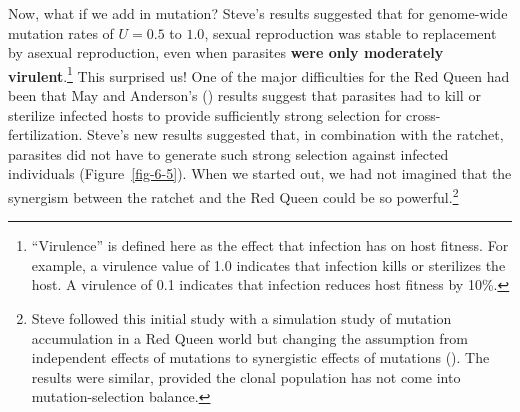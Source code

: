 \documentclass[
  letterpaper,
]{book}
\begin{document}
Now, what if we add in mutation? Steve's results suggested that for
genome-wide mutation rates of \(U = 0.5\) to \(1.0\), sexual
reproduction was stable to replacement by asexual reproduction, even
when parasites \textbf{were only moderately virulent}.\footnote{``Virulence''
  is defined here as the effect that infection has on host fitness. For
  example, a virulence value of 1.0 indicates that infection kills or
  sterilizes the host. A virulence of 0.1 indicates that infection
  reduces host fitness by 10\%.} This surprised us! One of the major
difficulties for the Red Queen had been that May and Anderson's
() results suggest that parasites had to
kill or sterilize infected hosts to provide sufficiently strong
selection for cross-fertilization. Steve's new results suggested that,
in combination with the ratchet, parasites did not have to generate such
strong selection against infected individuals (Figure~\ref{fig-6-5}).
When we started out, we had not imagined that the synergism between the
ratchet and the Red Queen could be so powerful.\footnote{Steve followed
  this initial study with a simulation study of mutation accumulation in
  a Red Queen world but changing the assumption from independent effects
  of mutations to synergistic effects of mutations
  (). The results were
  similar, provided the clonal population has not come into
  mutation-selection balance.}
\end{document}
